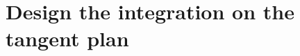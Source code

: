 \documentclass[a4paper]{article}\usepackage[]{graphicx}\usepackage[]{color}
\begin{document}
\section{Design the integration on the tangent plan}
% 
% 
% 
% 
% 
% 
% 
% 
% 
% 
\end{document}

